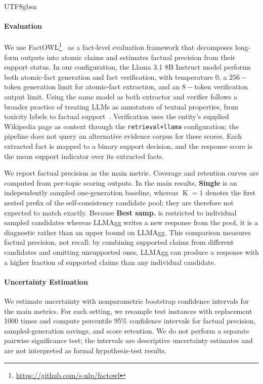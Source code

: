 \documentclass[11pt]{article}
\begin{document}
\begin{CJK*}{UTF8}{gbsn}
\paragraph{Evaluation}

We use FactOWL\footnote{\url{https://github.com/s-nlp/factowl}}~\citep{factowl} as a fact-level evaluation framework that decomposes long-form outputs into atomic claims and estimates factual precision from their support status. In our configuration, the Llama 3.1 8B Instruct model performs both atomic-fact generation and fact verification, with temperature 0, a $256\!-$token generation limit for atomic-fact extraction, and an $8-$token verification output limit. Using the same model as both extractor and verifier follows a broader practice of treating LLMs as annotators of textual properties, from toxicity labels to factual support~\citep{moskovskiy-etal-2024-llms, pletenev-etal-2025-much}. Verification uses the entity's supplied Wikipedia page as context through the \texttt{retrieval+llama} configuration; the pipeline does not query an alternative evidence corpus for these scores. Each extracted fact is mapped to a binary support decision, and the response score is the mean support indicator over its extracted facts.

We report factual precision as the main metric. Coverage and retention curves are computed from per-topic scoring outputs. In the main results, \textbf{Single} is an independently sampled one-generation baseline, whereas $\operatorname{K}=1$ denotes the first nested prefix of the self-consistency candidate pool; they are therefore not expected to match exactly. Because \textbf{Best samp.} is restricted to individual sampled candidates whereas LLMAgg writes a new response from the pool, it is a diagnostic rather than an upper bound on LLMAgg. This comparison measures factual precision, not recall: by combining supported claims from different candidates and omitting unsupported ones, LLMAgg can produce a response with a higher fraction of supported claims than any individual candidate.

\paragraph{Uncertainty Estimation}

We estimate uncertainty with nonparametric bootstrap confidence intervals for the main metrics. For each setting, we resample test instances with replacement 1000 times and compute percentile 95\% confidence intervals for factual precision, sampled-generation savings, and score retention. We do not perform a separate pairwise significance test; the intervals are descriptive uncertainty estimates and are not interpreted as formal hypothesis-test results.


\end{CJK*}
\end{document}
